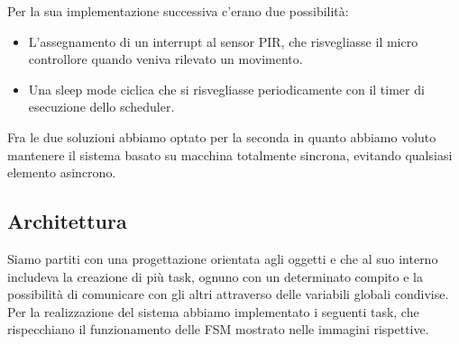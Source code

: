 \documentclass[a4paper]{article}
\begin{document}
Per la sua implementazione successiva c'erano due possibilità:
\begin{itemize}

\item {} L'assegnamento di un interrupt al sensor PIR, che risvegliasse il micro controllore quando veniva rilevato un movimento. 
\item{} Una sleep mode ciclica che si risvegliasse periodicamente con il timer di esecuzione dello scheduler.
\end{itemize}
Fra le due soluzioni abbiamo optato per la seconda in quanto abbiamo voluto mantenere il sistema basato su macchina totalmente sincrona, evitando qualsiasi elemento asincrono.

\subsection*{Architettura}
Siamo partiti con una progettazione orientata agli oggetti e che al suo interno includeva la creazione di più task, ognuno con un determinato compito e la possibilità di comunicare con gli altri attraverso delle variabili globali condivise. Per la realizzazione del sistema abbiamo implementato i seguenti task, che rispecchiano il funzionamento delle FSM mostrato nelle immagini rispettive.
\end{document}
